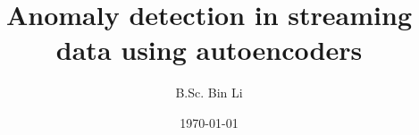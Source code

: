 \documentclass[a4paper,twoside,11pt]{book}
\title{Anomaly detection in streaming data using autoencoders}
\author{B.Sc. Bin Li}
\date{\today}
\renewcommand{\headrulewidth}{0pt}
\begin{document}
\frontmatter

\fancyfoot[C]{\thepage}

\tableofcontents

\makeatletter
\@openrightfalse
\makeatother

\listoffigures

\listoftables

\renewcommand*{\lstlistlistingname}{Codeverzeichniss}
\lstlistoflistings


\mainmatter
\renewcommand{\headrulewidth}{0.4pt}

\makeatletter
\@openrighttrue
\makeatother





\appendix


\end{document}
